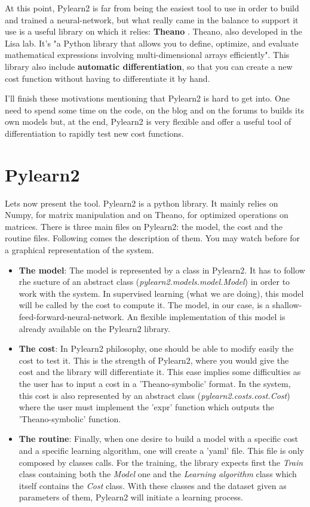 		At this point, Pylearn2 is far from being the easiest tool to use in order to build and trained a neural-network, but what really came in the balance to support it use is a useful library on which it relies: \textbf{Theano} \cite{bergstra+al:2010-scipy}. Theano, also developed in the Lisa lab. It's "a Python library that allows you to define, optimize, and evaluate mathematical expressions involving multi-dimensional arrays efficiently". This library also include \textbf{automatic differentiation}, so that you can create a new cost function without having to differentiate it by hand.

		I'll finish these motivations mentioning that Pylearn2 is hard to get into. One need to spend some time on the code, on the blog and on the forums to builds its own models but, at the end, Pylearn2 is very flexible and offer a useful tool of differentiation to rapidly test new cost functions.


	\section{Pylearn2}
		Lets now present the tool. Pylearn2 is a python library. It mainly relies on Numpy, for matrix manipulation and on Theano, for optimized operations on matrices. There is three main files on Pylearn2: the model, the cost and the routine files. Following comes the description of them. You may watch before  for a graphical representation of the system.
		\begin{itemize}
		  	\item \textbf{The model}: The model is represented by a class in Pylearn2. It has to follow rhe sucture of an abstract class (\textit{pylearn2.models.model.Model}) in order to work with the system. In supervised learning (what we are doing), this model will be called by the cost to compute it. The model, in our case, is a shallow-feed-forward-neural-network. An flexible implementation of this model is already available on the Pylearn2 library.
		  	\item \textbf{The cost}: In Pylearn2 philosophy, one should be able to modify easily the cost to test it. This is the strength of Pylearn2, where you would give the cost and the library will differentiate it. This ease implies some difficulties as the user has to input a cost in a 'Theano-symbolic' format. In the system, this cost is also represented by an abstract class (\textit{pylearn2.costs.cost.Cost}) where the user must implement the 'expr' function which outputs the 'Theano-symbolic' function.
		  	\item \textbf{The routine}: Finally, when one desire to build a model with a specific cost and a specific learning algorithm, one will create a 'yaml' file. This file is only composed by classes calls. For the training, the library expects first the \textit{Train} class containing both the \textit{Model} one and the \textit{Learning algorithm} class which itself contains the \textit{Cost} class. With these classes and the dataset given as parameters of them, Pylearn2 will initiate a learning process.
	  	\end{itemize}
			 
